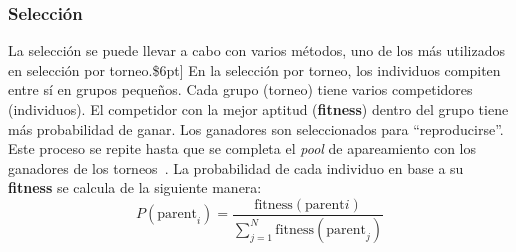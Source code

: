 \subsubsection{Selección}
La selección se puede llevar a cabo con varios métodos, uno de los más utilizados en selección por torneo.\$6pt]
En la selección por torneo, los individuos compiten entre sí en grupos pequeños. Cada grupo (torneo) tiene varios competidores (individuos). El competidor con la mejor aptitud (\textbf{fitness}) dentro del grupo tiene más probabilidad de ganar. Los ganadores son seleccionados para ``reproducirse''. Este proceso se repite hasta que se completa el \textit{pool} de apareamiento con los ganadores de los torneos~\cite{miller_genetic_nodate}. La probabilidad de cada individuo en base a su \textbf{fitness} se calcula de la siguiente manera:
\begin{equation}
    P(\text{parent}_i) = \frac{\text{fitness}(\text{parent}i)}{\sum_{j=1}^{N} \text{fitness}(\text{parent}_j)}
\end{equation}


